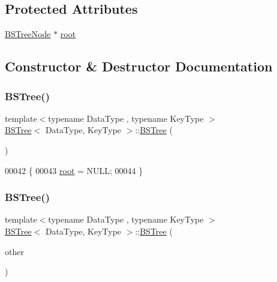 \subsection*{Protected Attributes}
\begin{DoxyCompactItemize}
\item 
\hyperlink{class_b_s_tree_1_1_b_s_tree_node}{B\+S\+Tree\+Node} $\ast$ \hyperlink{class_b_s_tree_a83534afce9094181ac031f9f596a8625}{root}
\end{DoxyCompactItemize}


\subsection{Constructor \& Destructor Documentation}
\hypertarget{class_b_s_tree_a4513fc6697f5e51bff8e7c448b446c9e}{}\label{class_b_s_tree_a4513fc6697f5e51bff8e7c448b446c9e} 
\subsubsection{\texorpdfstring{B\+S\+Tree()}{BSTree()}\hspace{0.1cm}{\footnotesize\ttfamily [1/2]}}
{\footnotesize\ttfamily template$<$typename Data\+Type , typename Key\+Type $>$ \\
\hyperlink{class_b_s_tree}{B\+S\+Tree}$<$ Data\+Type, Key\+Type $>$\+::\hyperlink{class_b_s_tree}{B\+S\+Tree} (\begin{DoxyParamCaption}{ }\end{DoxyParamCaption})}


\begin{DoxyCode}
00042 \{
00043     \hyperlink{class_b_s_tree_a83534afce9094181ac031f9f596a8625}{root} = NULL;
00044 \}
\end{DoxyCode}
\hypertarget{class_b_s_tree_a6658391c178cb35858c9c465e1839fb0}{}\label{class_b_s_tree_a6658391c178cb35858c9c465e1839fb0} 
\subsubsection{\texorpdfstring{B\+S\+Tree()}{BSTree()}\hspace{0.1cm}{\footnotesize\ttfamily [2/2]}}
{\footnotesize\ttfamily template$<$typename Data\+Type , typename Key\+Type $>$ \\
\hyperlink{class_b_s_tree}{B\+S\+Tree}$<$ Data\+Type, Key\+Type $>$\+::\hyperlink{class_b_s_tree}{B\+S\+Tree} (\begin{DoxyParamCaption}\item[{const \hyperlink{class_b_s_tree}{B\+S\+Tree}$<$ Data\+Type, Key\+Type $>$ \&}]{other }\end{DoxyParamCaption})}



